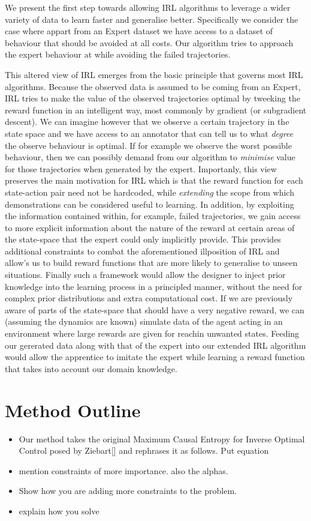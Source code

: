 \documentclass[conference]{IEEEtran}
\begin{document}
We present the first step towards allowing IRL algorithms to leverage a wider variety of data to learn faster and generalise better. Specifically we consider the case where appart from
an Expert dataset we have access to a dataset of behaviour that should be avoided at all costs. Our algorithm tries to approach the expert behaviour at while avoiding the failed trajectories.

This altered view of IRL emerges from the basic principle that governs most IRL algorithms. Because the observed data is assumed to be coming from an Expert, IRL tries to make the value of the observed trajectories optimal by tweeking the reward function in an intelligent way, most commonly by gradient (or subgradient descent). We can imagine however that we observe a certain trajectory in the state space and we have access to an annotator that can tell us to what \emph{degree} the observe behaviour is optimal. If for example we observe the worst possible behaviour, then we can possibly demand from our algorithm to \emph{minimise} value for those trajectories when generated by the expert. Importanly, this view preserves the main motivation for IRL which is that the reward function for each state-action pair need not be hardcoded, while \emph{extending} the scope from which demonstrations can be considered useful to learning. In addition, by exploiting the information contained within, for example, failed trajectories, we gain access to more explicit information about the nature of the reward at certain areas of the state-space that the expert could only implicitly provide. This provides additional constraints to combat the aforementioned illposition of IRL and allow's us to build reward functions that are more likely to generalise to unseen situations. Finally such a framework would allow the designer to inject prior knowledge into the learning process in a principled manner, without the need for complex prior distributions and extra computational cost. If we are previously aware of parts of the state-space that should have a very negative reward, we can (assuming the dynamics are known) simulate data of the agent acting in an environment where large rewards are given for reachin unwanted states. Feeding our gererated data along with that of the expert into our extended IRL algorithm would allow the apprentice to imitate the expert while learning a reward function that takes into account our domain knowledge.



\section{Method Outline}
	\begin{itemize}	
		\item Our method takes the original Maximum Causal Entropy for Inverse Optimal Control posed by Ziebart[] and rephrases it as follows. Put equation
		\item mention constraints of more importance. also the alphas. 
		\item Show how you are adding more constraints to the problem.
		\item explain how you solve 
	\end{itemize}
\end{document}
